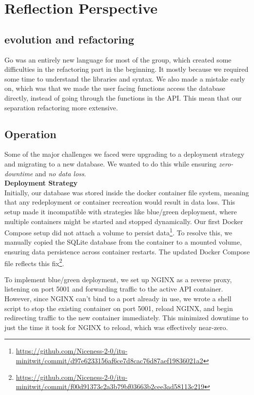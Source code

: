 \section{Reflection Perspective}
\subsection{evolution and refactoring}

Go was an entirely new language for most of the group, which created some difficulties in the refactoring part in the beginning. It mostly because we required some time to understand the libraries and syntax. 
We also made a mistake early on, which was that we made the user facing functions access the database directly, instead of going through the functions in the API. This mean that our separation refactoring more extensive.


\subsection{Operation}
Some of the major challenges we faced were upgrading to a deployment strategy and migrating to a new database. We wanted to do this while ensuring \textit{zero-downtime} and \textit{no data loss}.
\\

\noindent \textbf{Deployment Strategy}
\\
Initially, our database was stored inside the docker container file system, meaning that any redeployment or container recreation would result in data loss. This setup made it incompatible with strategies like blue/green deployment, where multiple containers might be started and stopped dynamically. Our first Docker Compose setup did not attach a volume to persist data\footnote{\url{https://github.com/Niceness-2-0/itu-minitwit/commit/d97e6233156af6ce7d8cac76d87aef19836021a2}}. To resolve this, we manually copied the SQLite database from the container to a mounted volume, ensuring data persistence across container restarts. The updated Docker Compose file reflects this fix\footnote{\url{https://github.com/Niceness-2-0/itu-minitwit/commit/f00d91373c2a3b79bf03663b2cee3ad58113c219}}.

To implement blue/green deployment, we set up NGINX as a reverse proxy, listening on port 5001 and forwarding traffic to the active API container. However, since NGINX can't bind to a port already in use, we wrote a shell script to stop the existing container on port 5001, reload NGINX, and begin redirecting traffic to the new container immediately. This minimized downtime to just the time it took for NGINX to reload, which was effectively near-zero.
\\

